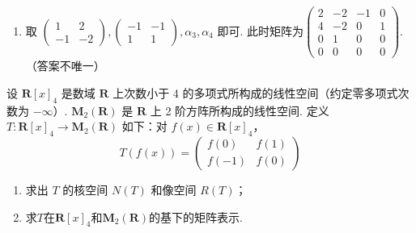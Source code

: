 \begin{exercise}
\begin{exgroup}
\begin{answer}
\begin{enumerate}
                \item 取 $ \begin{pmatrix} 1 & 2 \\ -1 & -2 \end{pmatrix}, \begin{pmatrix} -1 & -1 \\ 1 & 1 \end{pmatrix}, \alpha_3, \alpha_4 $ 即可. 此时矩阵为$ \begin{pmatrix}
                              2 & -2 & -1 & 0 \\
                              4 & -2 & 0  & 1 \\
                              0 & 1  & 0  & 0 \\
                              0 & 0  & 0  & 0
                          \end{pmatrix} $. （答案不唯一）
            \end{enumerate}
        \end{answer}

        \item 设 $\mathbf{R}[x]_4$ 是数域 $\mathbf{R}$ 上次数小于 4 的多项式所构成的线性空间（约定零多项式次数为 $-\infty$）. $\mathbf{M}_2(\mathbf{R})$ 是 $\mathbf{R}$ 上 2 阶方阵所构成的线性空间. 定义 $T \colon \mathbf{R}[x]_4 \to \mathbf{M}_2(\mathbf{R})$ 如下：对 $f(x) \in \mathbf{R}[x]_4$，
        \[T(f(x))=\begin{pmatrix}f(0) & f(1) \\ f(-1) & f(0)\end{pmatrix}\]
        \begin{enumerate}
            \item 求出 $T$ 的核空间 $N(T)$ 和像空间 $R(T)$；

            \item 求$T$在$\mathbf{R}[x]_4$和$\mathbf{M}_2(\mathbf{R})$的基下的矩阵表示.
        \end{enumerate}


\end{exgroup}
\end{exercise}
